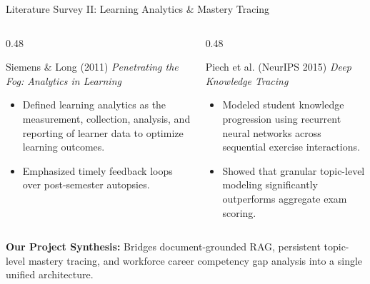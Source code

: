 \documentclass[aspectratio=169,10pt]{beamer}
\begin{document}
\begin{frame}{Literature Survey II: Learning Analytics \& Mastery Tracing}
  \begin{columns}[T]
    \begin{column}{0.48\textwidth}
      \begin{block}{Siemens \& Long (2011)}
        \textit{Penetrating the Fog: Analytics in Learning}
        \begin{itemize}
          \item Defined learning analytics as the measurement, collection, analysis, and reporting of learner data to optimize learning outcomes.
          \item Emphasized timely feedback loops over post-semester autopsies.
        \end{itemize}
      \end{block}
    \end{column}
    \begin{column}{0.48\textwidth}
      \begin{block}{Piech et al. (NeurIPS 2015)}
        \textit{Deep Knowledge Tracing}
        \begin{itemize}
          \item Modeled student knowledge progression using recurrent neural networks across sequential exercise interactions.
          \item Showed that granular topic-level modeling significantly outperforms aggregate exam scoring.
        \end{itemize}
      \end{block}
    \end{column}
  \end{columns}
  \vspace{0.2cm}
  \textbf{Our Project Synthesis:} Bridges document-grounded RAG, persistent topic-level mastery tracing, and workforce career competency gap analysis into a single unified architecture.
\end{frame}
\end{document}
